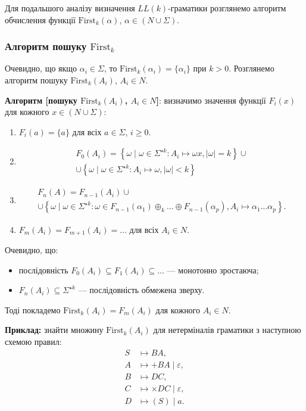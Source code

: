 Для подальшого аналізу визначення $LL(k)$-граматики розглянемо алгоритм обчислення функції $\text{First}_k (\alpha)$, $\alpha \in (N \cup \Sigma)$.

\subsubsection{Алгоритм пошуку \texorpdfstring{$\text{First}_k$}{Firstk}}

Очевидно, що якщо $\alpha_i \in \Sigma$, то $\text{First}_k (\alpha_i) = \{\alpha_i\}$ при $k > 0$. Розглянемо алгоритм пошуку $\text{First}_k (A_i)$, $A_i \in N$.\medskip

\textbf{Алгоритм [пошуку $\text{First}_k(A_i)$, $A_i \in N$]}: визначимо значення функції $F_i(x)$ для кожного $x \in (N \cup \Sigma)$: 
\begin{enumerate}
	\item $F_i (a) = \{a\}$ для всіх $a \in \Sigma$, $i \ge 0$.
	\item \begin{multline}
	    F_0(A_i) = \left\{ \omega \mid \omega \in \Sigma^{\star k}: A_i \mapsto \omega x, \vert\omega\vert = k \right\} \cup \\
	    \cup \left\{ \omega \mid \omega \in \Sigma^{\star k}: A_i \mapsto \omega, \vert\omega\vert < k \right\}
	\end{multline}
	\item \begin{multline}
		F_n(A) = F_{n - 1}(A_i) \cup \\
		\cup\left\{ \omega \mid \omega \in \Sigma^{\star k}: \omega \in F_{n - 1} (\alpha_1) \oplus_k \ldots \oplus F_{n - 1} (\alpha_p), A_i \mapsto \alpha_1 \ldots \alpha_p \right\}.
	\end{multline}
	\item $F_m(A_i) = F_{m + 1}(A_i) = \ldots$ для всіх $A_i \in N$.
\end{enumerate}

Очевидно, що:
\begin{itemize}
	\item послідовність $F_0 (A_i) \subseteq F_1(A_i) \subseteq \ldots$ --- монотонно зростаюча;
	\item $F_n(A_i) \subseteq \Sigma^{\star k}$ --- послідовність обмежена зверху.
\end{itemize}

Тоді покладемо $\text{First}_k(A_i) = F_m(A_i)$ для кожного $A_i \in N$. \medskip

\textbf{Приклад:} знайти множину $\text{First}_k (A_i)$ для нетерміналів граматики з наступною схемою правил: 
\begin{align}
	S &\mapsto BA, \\
	A &\mapsto +BA \mid \varepsilon, \\
	B &\mapsto DC, \\
	C &\mapsto \times DC \mid \varepsilon, \\
	D &\mapsto (S) \mid a.
\end{align}

